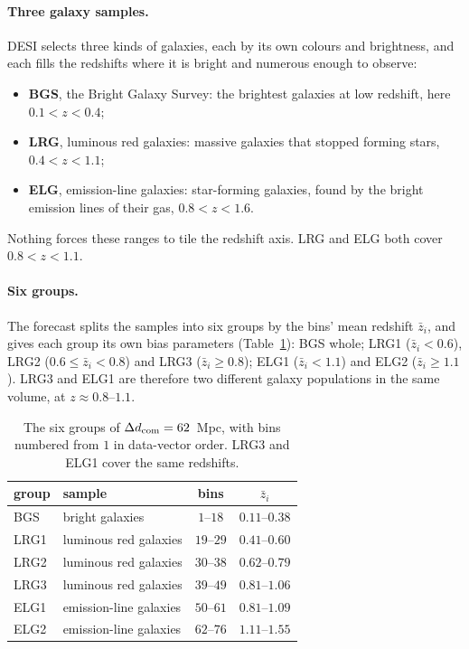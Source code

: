 \documentclass[11pt]{article}
\newcommand{\dcom}{$\Delta d_{\rm com} = 62$~Mpc}
\begin{document}
\paragraph{Three galaxy samples.}
DESI selects three kinds of galaxies, each by its own colours and
brightness, and each fills the redshifts where it is bright and
numerous enough to observe:
\begin{itemize}
  \item \textbf{BGS}, the Bright Galaxy Survey: the brightest galaxies
    at low redshift, here $0.1 < z < 0.4$;
  \item \textbf{LRG}, luminous red galaxies: massive galaxies that
    stopped forming stars, $0.4 < z < 1.1$;
  \item \textbf{ELG}, emission-line galaxies: star-forming galaxies,
    found by the bright emission lines of their gas, $0.8 < z < 1.6$.
\end{itemize}
Nothing forces these ranges to tile the redshift axis.  LRG and ELG
both cover $0.8 < z < 1.1$.

\paragraph{Six groups.}
The forecast splits the samples into six groups by the bins' mean
redshift $\bar{z}_i$, and gives each group its own bias parameters
(Table~\ref{tab:groups}): BGS whole; LRG1 ($\bar{z}_i < 0.6$), LRG2
($0.6 \le \bar{z}_i < 0.8$) and LRG3 ($\bar{z}_i \ge 0.8$); ELG1
($\bar{z}_i < 1.1$) and ELG2 ($\bar{z}_i \ge 1.1$).  LRG3 and ELG1 are
therefore two different galaxy populations in the same volume, at
$z \approx 0.8$--$1.1$.

\begin{table}[ht]
  \centering
  \begin{tabular}{llcc}
    \hline
    group & sample & bins & $\bar{z}_i$ \\
    \hline
    BGS & bright galaxies & $1$--$18$ & $0.11$--$0.38$ \\
    LRG1 & luminous red galaxies & $19$--$29$ & $0.41$--$0.60$ \\
    LRG2 & luminous red galaxies & $30$--$38$ & $0.62$--$0.79$ \\
    LRG3 & luminous red galaxies & $39$--$49$ & $0.81$--$1.06$ \\
    ELG1 & emission-line galaxies & $50$--$61$ & $0.81$--$1.09$ \\
    ELG2 & emission-line galaxies & $62$--$76$ & $1.11$--$1.55$ \\
    \hline
  \end{tabular}
  \caption{The six groups of \dcom{}, with bins numbered from $1$ in
    data-vector order.  LRG3 and ELG1 cover the same redshifts.}
  \label{tab:groups}
\end{table}
\end{document}
